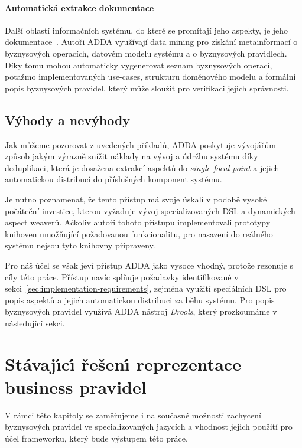 \paragraph{Automatická extrakce dokumentace}

Další oblastí informačních systému, do které se promítají jeho aspekty,
je jeho dokumentace~\cite{cemus2017automated}. Autoři \gls{ADDA}
využívají data mining pro získání metainformací o byznysových operacích,
datovém modelu systému a o byznysových pravidlech. Díky tomu mohou
automaticky vygenerovat seznam byznysových operací, potažmo implementovaných
use-cases, strukturu doménového modelu a formální popis byznysových pravidel,
který může sloužit pro verifikaci jejich správnosti.

\subsection{Výhody a nevýhody}

Jak můžeme pozorovat z uvedených příkladů, \gls{ADDA} poskytuje
vývojářům způsob jakým výrazně snížit náklady na vývoj a údržbu
systému díky deduplikaci, která je dosažena extrakcí aspektů
do \textit{single focal point} a jejich automatickou distribucí do
příslušných komponent systému.

Je nutno poznamenat, že tento přístup má svoje úskalí v podobě
vysoké počáteční investice, kterou vyžaduje vývoj specializovaných
\gls{DSL} a dynamických aspect weaverů. Ačkoliv autoři
tohoto přístupu implementovali prototypy knihoven umožňující
požadovanou funkcionalitu, pro nasazení do reálného systému
nejsou tyto knihovny připraveny.

Pro náš účel se však jeví přístup \gls{ADDA} jako vysoce vhodný, protože
rezonuje s cíly této práce. Přístup navíc splňuje požadavky
identifikované v sekci~\ref{sec:implementation-requirements},
zejména využití speciálních \gls{DSL} pro popis aspektů a
jejich automatickou distribuci za běhu systému. Pro popis byznysových pravidel
využívá \gls{ADDA} nástroj \textit{Drools}, který prozkoumáme v následující sekci.

\section{Stávaj\'{\i}c\'{\i} řešen\'{\i} reprezentace business pravidel}\label{sec:business-rule-dsl}

V rámci této kapitoly se zaměřujeme i na současné možnosti zachycení
byznysových pravidel ve specializovaných jazycích a vhodnost jejich použití
pro účel frameworku, který bude výstupem této práce.


